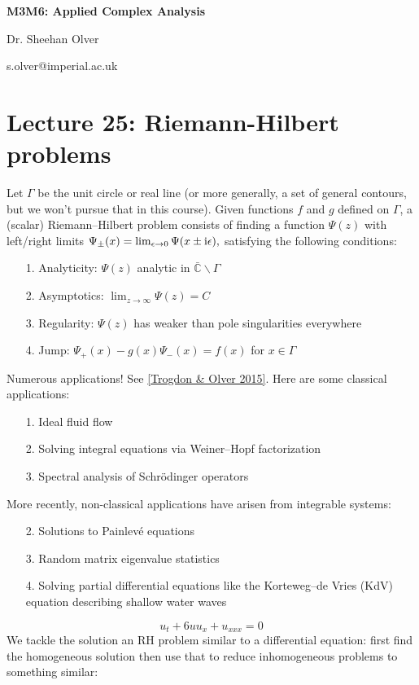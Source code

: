 \documentclass[12pt,a4paper]{article}
\def\I{ {\rm i} }
\def\C{ {\mathbb C} }
\def\endash{–}
\begin{document}
\textbf{M3M6: Applied Complex Analysis}

Dr. Sheehan Olver

s.olver@imperial.ac.uk

\section{Lecture 25: Riemann-Hilbert problems}
Let $\Gamma$ be the unit circle or real line (or more generally, a set of general contours, but we won't pursue that in this course).  Given functions $f$ and $g$ defined on $\Gamma$, a (scalar) Riemann\ensuremath{\endash}Hilbert problem consists of finding a function $\Psi(z)$ with left/right limits  $\Psi_\pm(x) = \lim_{\epsilon \rightarrow 0} \Psi(x \pm \I \epsilon),$ satisfying the following conditions:

\begin{itemize}
\item[1. ] Analyticity: $\Psi(z)$ analytic in $\bar\C \backslash \Gamma$


\item[2. ] Asymptotics: $\lim_{z \rightarrow \infty} \Psi(z) = C$


\item[3. ] Regularity: $\Psi(z)$ has weaker than pole singularities everywhere


\item[4. ] Jump: $\Psi_+(x) - g(x) \Psi_-(x) = f(x)$ for $x \in \Gamma$

\end{itemize}
Numerous applications! See \href{http://bookstore.siam.org/ot146/}{[Trogdon \& Olver 2015]}. Here are some classical applications:

\begin{itemize}
\item[1. ] Ideal fluid flow


\item[2. ] Solving integral equations via Weiner\ensuremath{\endash}Hopf factorization


\item[3. ] Spectral analysis of Schrödinger operators

\end{itemize}
More recently, non-classical applications have arisen from integrable systems:

\begin{itemize}
\item[2. ] Solutions to Painlevé equations 


\item[3. ] Random matrix eigenvalue statistics


\item[4. ] Solving partial differential equations like the Korteweg\ensuremath{\endash}de Vries (KdV) equation describing shallow water waves

\end{itemize}
\[
u_t + 6u u_x + u_{xxx} = 0
\]
We tackle the solution an RH problem similar to a differential equation: first find the homogeneous solution then use that to reduce inhomogeneous problems to something similar:
\end{document}
